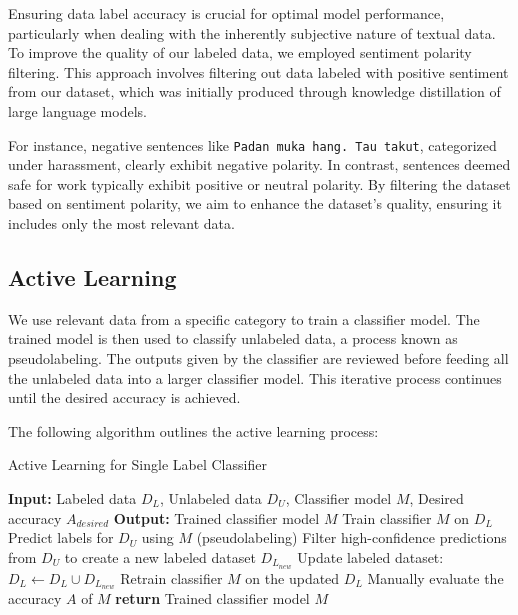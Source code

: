 \documentclass[preprint]{article}
\begin{document}
Ensuring data label accuracy is crucial for optimal model performance, particularly when dealing with the inherently subjective nature of textual data. To improve the quality of our labeled data, we employed sentiment polarity filtering. This approach involves filtering out data labeled with positive sentiment from our dataset, which was initially produced through knowledge distillation of large language models.

For instance, negative sentences like \texttt{Padan muka hang. Tau takut}, categorized under harassment, clearly exhibit negative polarity. In contrast, sentences deemed safe for work typically exhibit positive or neutral polarity. By filtering the dataset based on sentiment polarity, we aim to enhance the dataset's quality, ensuring it includes only the most relevant data.

\subsection{Active Learning}

We use relevant data from a specific category to train a classifier model. The trained model is then used to classify unlabeled data, a process known as pseudolabeling. The outputs given by the classifier are reviewed before feeding all the unlabeled data into a larger classifier model. This iterative process continues until the desired accuracy is achieved.

The following algorithm outlines the active learning process:

\begin{algorithm}[H]
  \caption{Active Learning for Single Label Classifier}
  \begin{algorithmic}[1]
    \State \textbf{Input:} Labeled data \(D_L\), Unlabeled data \(D_U\), Classifier model \(M\), Desired accuracy \(A_{desired}\)
    \State \textbf{Output:} Trained classifier model \(M\)
    \State Train classifier \(M\) on \(D_L\)
    \State Predict labels for \(D_U\) using \(M\) (pseudolabeling)
    \State Filter high-confidence predictions from \(D_U\) to create a new labeled dataset \(D_{L_{new}}\)
    \State Update labeled dataset: \(D_L \leftarrow D_L \cup D_{L_{new}}\)
    \State Retrain classifier \(M\) on the updated \(D_L\)
    \State Manually evaluate the accuracy \(A\) of \(M\)
    \EndWhile
    \State \textbf{return} Trained classifier model \(M\)
  \end{algorithmic}
\end{algorithm}
\end{document}
